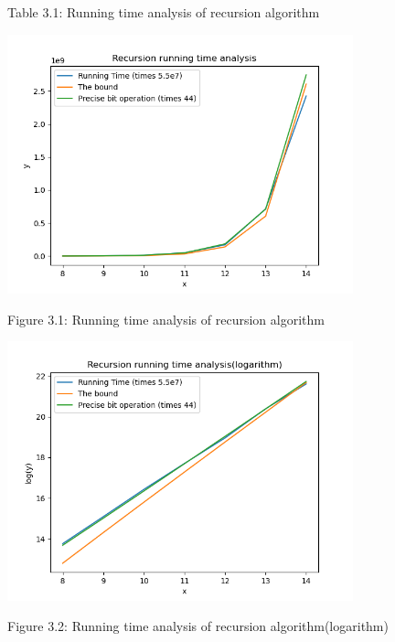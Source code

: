 \documentclass[11pt,a4paper,oneside]{article}
\begin{document}
\begin{problem}{3}
\begin{table}[htbp]
\begin{tabular}{cccc}
		\end{tabular}%
		\par\scriptsize Table 3.1: Running time analysis of recursion algorithm
	\end{table}%
	\begin{center}
	\includegraphics[width=100mm]{Figure_1.png}\scriptsize\par
	Figure 3.1: Running time analysis of recursion algorithm
	\end{center}
	\begin{center}
	\includegraphics[width=100mm]{Figure_2.png}\scriptsize\par
	Figure 3.2: Running time analysis of recursion algorithm(logarithm)
	\end{center}
\end{problem}
\end{document}
